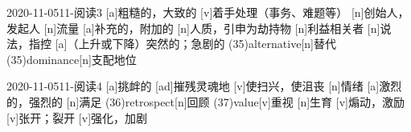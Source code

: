 \documentclass[12pt]{ctexart}
\begin{document}
\begin{wordlist}{2020-11-05}{11-阅读3}
  [a]{粗糙的，大致的}
  [v]{着手处理（事务、难题等）}
  [n]{创始人，发起人}
  [n]{流量}
  [a]{补充的，附加的}
  [n]{人质，引申为劫持物}
  [n]{利益相关者}
  [n]{说法，指控}
  [a]{（上升或下降）突然的；急剧的}
  \word(35){alternative}[n]{替代}
  \word(35){dominance}[n]{支配地位}
\end{wordlist}

\begin{wordlist}{2020-11-05}{11-阅读4}
  [a]{挑衅的}
  [ad]{摧残灵魂地}
  [v]{使扫兴，使沮丧}
  [n]{情绪}
  [a]{激烈的，强烈的}
  [n]{满足}
  \word(36){retrospect}[n]{回顾}
  \word(37){value}[v]{重视}
  [n]{生育}
  [v]{煽动，激励}
  [v]{张开；裂开}
  [v]{强化，加剧}
\end{wordlist}
\end{document}

